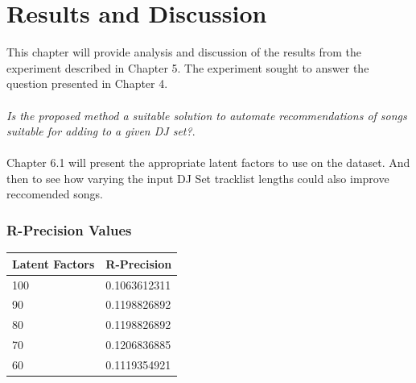 
\graphicspath{{Chapter6/}}

\chapter{Results and Discussion}

This chapter will provide analysis and discussion of the results from the experiment described
in Chapter 5. The experiment sought to answer the question presented in Chapter 4.
\\
\\
\textit{Is the proposed method a suitable solution to automate recommendations of songs suitable for adding to a given DJ set?}.
\\
\\
Chapter 6.1 will present the appropriate latent factors to use on the dataset. And then to see how varying the input DJ Set tracklist lengths could also improve reccomended songs.

\subsection{R-Precision Values}
\begin{center}
	\begin{tabular}{ | m{3cm}| m{3cm} | } 
		\hline
		Latent Factors & R-Precision\\ 
		\hline
		100 &	0.1063612311\\
		\hline
		90 &	0.1198826892\\
		\hline
		80	&	0.1198826892\\
		\hline
		70	&	0.1206836885\\
		\hline
		60	&	0.1119354921\\
	\end{tabular}
\end{center}

